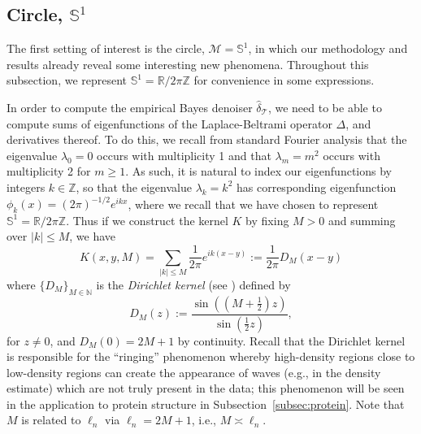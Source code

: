 \documentclass[preprint]{imsart}
\theoremstyle{plain}
\theoremstyle{definition}
\newcommand{\Rbb}{\mathbb{R}}
\newcommand{\Zbb}{\mathbb{Z}}
\newcommand{\Nbb}{\mathbb{N}}
\newcommand{\Mcal}{\mathcal{M}}
\newcommand{\T}{\mathcal{T}}
\begin{document}
\fi




\subsection{Circle, $\mathbb{S}^1$}\label{subsec:sim-circle}
The first setting of interest is the circle, $\Mcal=\mathbb{S}^1$, in which our methodology and results already reveal some interesting new phenomena.
Throughout this subsection, we represent $\mathbb{S}^1 =\Rbb/2\pi \Zbb$ for convenience in some expressions.


In order to compute the empirical Bayes denoiser $\hat{\delta}_{\T}$, we need to be able to compute sums of eigenfunctions of the Laplace-Beltrami operator $\Delta$, and derivatives thereof.
To do this, we recall from standard Fourier analysis that the eigenvalue $\lambda_0=0$ occurs with multiplicity 1 and that $\lambda_{m}=m^2$ occurs with multiplicity 2 for $m\ge 1$.
As such, it is natural to index our eigenfunctions by integers $k\in\Zbb$, so that the eigenvalue $\lambda_{k}=k^2$ has corresponding eigenfunction $\phi_{k}(x) = (2\pi)^{-1/2}e^{ik x}$, where we recall that we have chosen to represent $\mathbb{S}^1=\Rbb/2\pi\Zbb$.
Thus if we construct the kernel $K$ by fixing $M>0$ and summing over $|k|\le M$, we have 
\begin{equation*}
    K(x,y,M) = \sum_{|k|\le M}\frac{1}{2\pi}e^{ik(x-y)} := \frac{1}{2\pi}D_M(x-y)
\end{equation*}
where $\{D_M\}_{M\in\Nbb}$ is the \textit{Dirichlet kernel} (see \cite[p. 206]{TaylorPDE}) defined by
\begin{equation}\label{eqn:Dirichlet-kernel}
    D_M(z) := \frac{\sin\left(\left(M+\frac{1}{2}\right)z\right)}{\sin\left(\frac{1}{2}z\right)},
\end{equation}
for $z\neq 0$, and $D_M(0)=2M+1$ by continuity.
Recall that the Dirichlet kernel is responsible for the ``ringing'' phenomenon whereby high-density regions close to low-density regions can create the appearance of waves (e.g., in the density estimate) which are not truly present in the data; this phenomenon will be seen in the application to protein structure in Subsection~\ref{subsec:protein}.
Note that $M$ is related to $\ell_n$ via $\ell_n = 2M+1$, i.e., $M\asymp \ell_n$.
\end{document}
